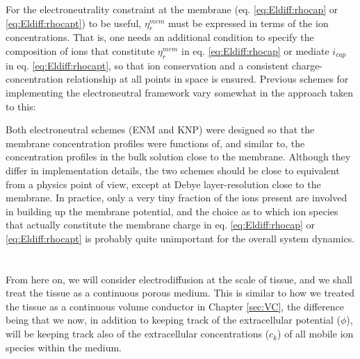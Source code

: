 For the electroneutrality constraint at the membrane (eq. \ref{eq:Eldiff:rhocap} or \ref{eq:Eldiff:rhocapt}) to be useful, $\eta_{r}^{mem}$ must be expressed in terms of the ion concentrations. That is, one needs an additional condition to specify the composition of ions that constitute $\eta_{r}^{mem}$ in eq. \ref{eq:Eldiff:rhocap} or mediate $i_{cap}$ in eq. \ref{eq:Eldiff:rhocapt}, so that ion conservation and a consistent charge-concentration relationship  at all points in space is ensured. Previous schemes for implementing the electroneutral framework vary somewhat in the approach taken to this:


Both electroneutral schemes (ENM and KNP) were designed so that the membrane concentration profiles were functions of, and similar to, the concentration profiles in the bulk solution close to the membrane. Although they differ in implementation details, the two schemes should be close to equivalent from a physics point of view, except at Debye layer-resolution close to the membrane.  In practice, only a very tiny fraction of the ions present are involved in building up the membrane potential, and the choice as to which ion species that actually constitute the membrane charge in eq. \ref{eq:Eldiff:rhocap} or \ref{eq:Eldiff:rhocapt} is probably quite unimportant for the overall system dynamics.


\section{}
\label{sec:Eldiff:porous}
From here on, we will consider electrodiffusion at the scale of tissue, and we shall treat the tissue as a continuous porous medium. This is similar to how we treated the tissue as a continuous volume conductor in Chapter \ref{sec:VC}, the difference being that we now, in addition to keeping track of the extracellular potential ($\phi$), will be keeping track also of the extracellular concentrations ($c_k$) of all mobile ion species within the medium. 

